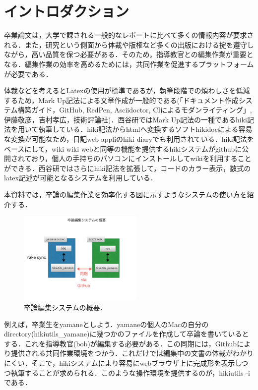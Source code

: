 
\section{イントロダクション}
卒業論文は，大学で課される一般的なレポートに比べて多くの情報内容が要求される．また，研究という側面から体裁や版権など多くの出版における掟を遵守しながら，高い品質を保つ必要がある．そのため，指導教官との編集作業が重要となる．編集作業の効率を高めるためには，共同作業を促進するプラットフォームが必要である．

体裁などを考えるとLatexの使用が標準であるが，執筆段階での煩わしさを低減するため，Mark Up記法による文章作成が一般的である(「ドキュメント作成システム構築ガイド，GitHub, RedPen, Asciidoctor, CIによるモダンライティング」, 伊藤敬彦，吉村孝広，技術評論社)．西谷研ではMark Up記法の一種であるhiki記法を用いて執筆している．hiki記法からhtmlへ変換するソフトhikidocによる容易な変換が可能なため，日記web appliのhiki diaryでも利用されている．hiki記法をベースにして，wiki wiki webと同等の機能を提供するhikiシステムがgithubに公開されており，個人の手持ちのパソコンにインストールしてwikiを利用することができる．西谷研ではさらにhiki記法を拡張して，コードのカラー表示，数式のlatex記述が可能となるシステムを利用している．

本資料では，卒論の編集作業を効率化する図に示すようなシステムの使い方を紹介する．

\begin{figure}[htbp]\begin{center}
\includegraphics[width=6cm,bb=0 0 442 500]{../figs/./hikiutils_bob.002.jpeg}
\caption{卒論編集システムの概要．}
\label{default}\end{center}\end{figure}
例えば，卒業生をyamaneとしよう．yamaneの個人のMacの自分のdirectory(hikiutils\_yamane)に幾つかのファイルを作成して卒論を書いているとする．これを指導教官(bob)が編集する必要がある．この同期には，Githubにより提供される共同作業環境をつかう．これだけでは編集中の文書の体裁がわかりにくい．そこで，hikiシステムにより容易にwebブラウザ上に完成形を表示しつつ執筆することが求められる．このような操作環境を提供するのが，hikiutils -iである．

